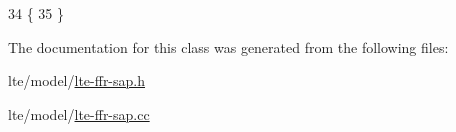 \begin{DoxyCode}
34 \{
35 \}
\end{DoxyCode}


The documentation for this class was generated from the following files\+:\begin{DoxyCompactItemize}
\item 
lte/model/\hyperlink{lte-ffr-sap_8h}{lte-\/ffr-\/sap.\+h}\item 
lte/model/\hyperlink{lte-ffr-sap_8cc}{lte-\/ffr-\/sap.\+cc}\end{DoxyCompactItemize}
